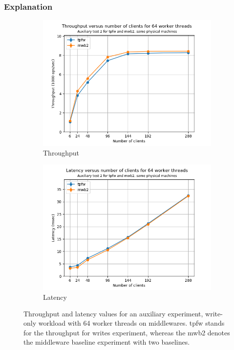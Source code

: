 \documentclass[11pt,a4paper]{article}
\begin{document}
\subsubsection{Explanation} \label{sec:tpfw-exp}
\begin{figure}[h]
\centering
\begin{subfigure}{.5\textwidth}
  \centering
  \includegraphics[width=1.0\linewidth,trim={0px 0px 0px 0px},clip]{img/plot/auxiliary-2-tp_mw.png}
  \caption{Throughput}
  \label{fig:auxiliary-2-tp_mw}
\end{subfigure}%
\begin{subfigure}{.5\textwidth}
  \centering
  \includegraphics[width=1.0\linewidth,trim={0px 0px 0px 0px},clip]{img/plot/auxiliary-2-lat_mw.png}
  \caption{Latency}
  \label{fig:auxiliary-2-lat_mw}
\end{subfigure}
\caption{Throughput and latency values for an auxiliary experiment, write-only workload with 64 worker threads on middlewares. tpfw stands for the throughput for writes experiment, whereas the mwb2 denotes the middleware baseline experiment with two baselines.}
\label{fig:auxiliary-2_mw}
\end{figure}
\end{document}
